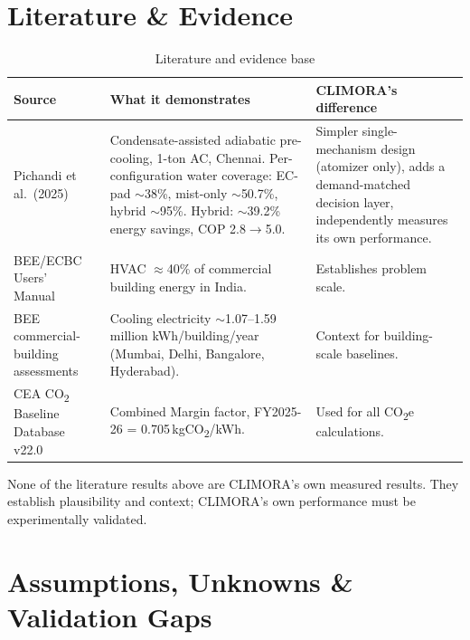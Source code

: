 \documentclass[11pt,a4paper]{article}
\begin{document}
\section{Literature \& Evidence}
\label{sec:literature}

\begin{table}[h!]
\centering
\small
\begin{tabular}{p{3.4cm}p{5cm}p{4cm}}
\toprule
\textbf{Source} & \textbf{What it demonstrates} & \textbf{CLIMORA's difference} \\
\midrule
Pichandi et al.\ (2025)~\cite{pichandi2025} & Condensate-assisted adiabatic pre-cooling, 1-ton AC, Chennai. Per-configuration water coverage: EC-pad $\sim$38\%, mist-only $\sim$50.7\%, hybrid $\sim$95\%. Hybrid: $\sim$39.2\% energy savings, COP 2.8$\to$5.0. & Simpler single-mechanism design (atomizer only), adds a demand-matched decision layer, independently measures its own performance. \\
BEE/ECBC Users' Manual~\cite{beeecbc} & HVAC $\approx$40\% of commercial building energy in India. & Establishes problem scale. \\
BEE commercial-building assessments~\cite{beeassessment} & Cooling electricity $\sim$1.07--1.59 million kWh/building/year (Mumbai, Delhi, Bangalore, Hyderabad). & Context for building-scale baselines. \\
CEA CO\textsubscript{2} Baseline Database v22.0~\cite{ceadb} & Combined Margin factor, FY2025-26 = 0.705\,kgCO\textsubscript{2}/kWh. & Used for all CO\textsubscript{2}e calculations. \\
\bottomrule
\end{tabular}
\caption{Literature and evidence base}
\end{table}

\begin{limitation}
None of the literature results above are CLIMORA's own measured results. They establish plausibility and context; CLIMORA's own performance must be experimentally validated.
\end{limitation}

\section{Assumptions, Unknowns \& Validation Gaps}
\label{sec:gaps}
\end{document}
